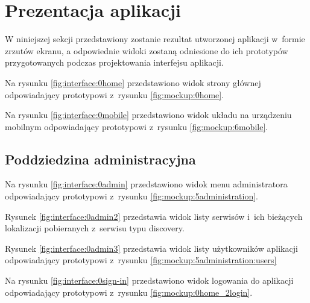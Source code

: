 \section{Prezentacja aplikacji}\label{sec:app-presentation}

W niniejszej sekcji przedstawiony zostanie rezultat utworzonej aplikacji w~formie zrzutów ekranu,
a odpowiednie widoki zostaną odniesione do ich prototypów przygotowanych podczas projektowania interfejsu aplikacji.

\par
Na rysunku \ref{fig:interface:0home} przedstawiono widok strony głównej odpowiadający prototypowi z~rysunku \ref{fig:mockup:0home}.


Na rysunku \ref{fig:interface:0mobile} przedstawiono widok układu na urządzeniu mobilnym odpowiadający prototypowi z~rysunku \ref{fig:mockup:6mobile}.


\subsection{Poddziedzina administracyjna}

Na rysunku \ref{fig:interface:0admin} przedstawiono widok menu administratora odpowiadający prototypowi z~rysunku \ref{fig:mockup:5administration}.


Rysunek \ref{fig:interface:0admin2} przedstawia widok listy serwisów i~ich bieżących lokalizacji pobieranych z~serwisu typu discovery.


Rysunek \ref{fig:interface:0admin3} przedstawia widok listy użytkowników aplikacji odpowiadający prototypowi z~rysunku \ref{fig:mockup:5administration:users}


Na rysunku \ref{fig:interface:0sign-in} przedstawiono widok logowania do aplikacji odpowiadający prototypowi z~rysunku \ref{fig:mockup:0home_2login}.


